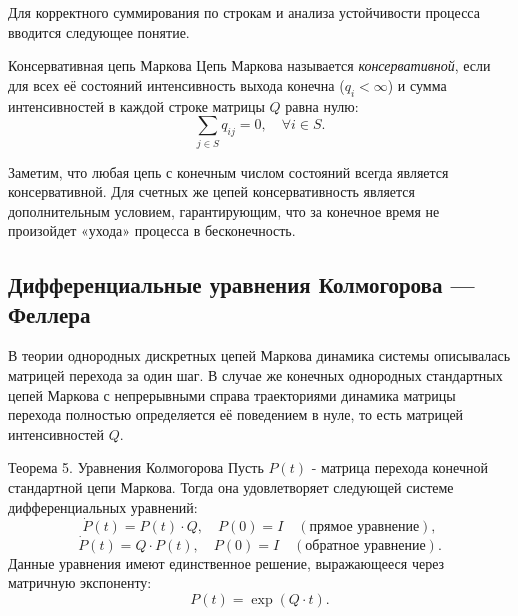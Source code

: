 Для корректного суммирования по строкам и анализа устойчивости процесса вводится следующее понятие.

\begin{definition}{Консервативная цепь Маркова}
    Цепь Маркова называется \textit{консервативной}, если для всех её состояний интенсивность выхода конечна ($q_i < \infty$) и сумма интенсивностей в каждой строке матрицы $Q$ равна нулю:
    \[
    \sum_{j \in S} q_{ij} = 0, \quad \forall i \in S.
    \]
\end{definition}

Заметим, что любая цепь с конечным числом состояний всегда является консервативной. Для счетных же цепей консервативность является дополнительным условием, гарантирующим, что за конечное время не произойдет «ухода» процесса в бесконечность.

\subsection{Дифференциальные уравнения Колмогорова — Феллера}

В теории однородных дискретных цепей Маркова динамика системы описывалась матрицей перехода за один шаг. В случае же конечных однородных стандартных цепей Маркова с непрерывными справа траекториями динамика матрицы перехода полностью определяется её поведением в нуле, то есть матрицей интенсивностей $Q$. %

\begin{theorem}{Теорема 5. Уравнения Колмогорова}
    Пусть $P(t)$ - матрица перехода конечной стандартной цепи Маркова. Тогда она удовлетворяет следующей системе дифференциальных уравнений:
    \[
    \dot{P}(t) = P(t) \cdot Q, \quad P(0) = I \quad (\text{прямое уравнение}),
    \]
    \[
    \dot{P}(t) = Q \cdot P(t), \quad P(0) = I \quad (\text{обратное уравнение}).
    \]
    Данные уравнения имеют единственное решение, выражающееся через матричную экспоненту:
    \[
    P(t) = \exp(Q \cdot t).
    \]
\end{theorem}

